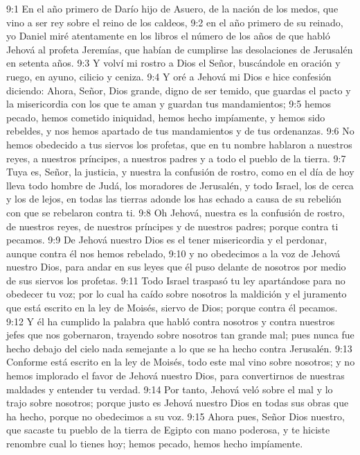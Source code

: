 9:1 En el año primero de Darío hijo de Asuero, de la nación de los medos, que vino a ser rey sobre el reino de los caldeos, 
9:2 en el año primero de su reinado, yo Daniel miré atentamente en los libros el número de los años de que habló Jehová al profeta Jeremías, que habían de cumplirse las desolaciones de Jerusalén en setenta años. 
9:3 Y volví mi rostro a Dios el Señor, buscándole en oración y ruego, en ayuno, cilicio y ceniza. 
9:4 Y oré a Jehová mi Dios e hice confesión diciendo: Ahora, Señor, Dios grande, digno de ser temido, que guardas el pacto y la misericordia con los que te aman y guardan tus mandamientos; 
9:5 hemos pecado, hemos cometido iniquidad, hemos hecho impíamente, y hemos sido rebeldes, y nos hemos apartado de tus mandamientos y de tus ordenanzas. 
9:6 No hemos obedecido a tus siervos los profetas, que en tu nombre hablaron a nuestros reyes, a nuestros príncipes, a nuestros padres y a todo el pueblo de la tierra. 
9:7 Tuya es, Señor, la justicia, y nuestra la confusión de rostro, como en el día de hoy lleva todo hombre de Judá, los moradores de Jerusalén, y todo Israel, los de cerca y los de lejos, en todas las tierras adonde los has echado a causa de su rebelión con que se rebelaron contra ti. 
9:8 Oh Jehová, nuestra es la confusión de rostro, de nuestros reyes, de nuestros príncipes y de nuestros padres; porque contra ti pecamos. 
9:9 De Jehová nuestro Dios es el tener misericordia y el perdonar, aunque contra él nos hemos rebelado, 
9:10 y no obedecimos a la voz de Jehová nuestro Dios, para andar en sus leyes que él puso delante de nosotros por medio de sus siervos los profetas. 
9:11 Todo Israel traspasó tu ley apartándose para no obedecer tu voz; por lo cual ha caído sobre nosotros la maldición y el juramento que está escrito en la ley de Moisés, siervo de Dios; porque contra él pecamos. 
9:12 Y él ha cumplido la palabra que habló contra nosotros y contra nuestros jefes que nos gobernaron, trayendo sobre nosotros tan grande mal; pues nunca fue hecho debajo del cielo nada semejante a lo que se ha hecho contra Jerusalén. 
9:13 Conforme está escrito en la ley de Moisés, todo este mal vino sobre nosotros; y no hemos implorado el favor de Jehová nuestro Dios, para convertirnos de nuestras maldades y entender tu verdad. 
9:14 Por tanto, Jehová veló sobre el mal y lo trajo sobre nosotros; porque justo es Jehová nuestro Dios en todas sus obras que ha hecho, porque no obedecimos a su voz. 
9:15 Ahora pues, Señor Dios nuestro, que sacaste tu pueblo de la tierra de Egipto con mano poderosa, y te hiciste renombre cual lo tienes hoy; hemos pecado, hemos hecho impíamente. 
